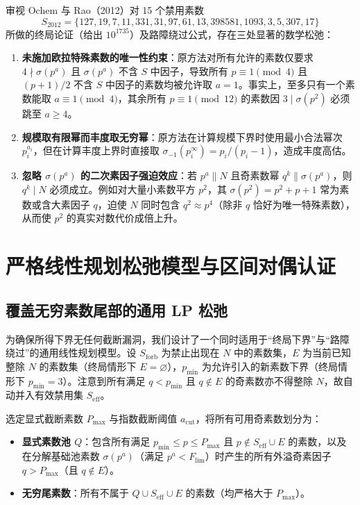 \documentclass[11pt, a4paper]{article}
\begin{document}
审视 Ochem 与 Rao（2012）对 15 个禁用素数
\[
S_{2012} = \{127, 19, 7, 11, 331, 31, 97, 61, 13, 398581, 1093, 3, 5, 307, 17\}
\]
所做的终局论证（给出 $10^{1735}$）及路障绕过公式，存在三处显著的数学松弛：
\begin{enumerate}
    \item \textbf{未施加欧拉特殊素数的唯一性约束}：原方法对所有允许的素数仅要求 $4 \nmid \sigma(p^a)$ 且 $\sigma(p^a)$ 不含 $S$ 中因子，导致所有 $p \equiv 1 \pmod{4}$ 且 $(p+1)/2$ 不含 $S$ 中因子的素数均被允许取 $a=1$。事实上，至多只有一个素数能取 $a \equiv 1 \pmod{4}$，其余所有 $p \equiv 1 \pmod{12}$ 的素数因 $3 \mid \sigma(p^2)$ 必须跳至 $a \ge 4$。
    \item \textbf{规模取有限幂而丰度取无穷幂}：原方法在计算规模下界时使用最小合法幂次 $p_i^{a_i}$，但在计算丰度上界时直接取 $\sigma_{-1}(p_i^{\infty}) = p_i/(p_i-1)$，造成丰度高估。
    \item \textbf{忽略 $\sigma(p^a)$ 的二次素因子强迫效应}：若 $p^a \parallel N$ 且奇素数幂 $q^k \parallel \sigma(p^a)$，则 $q^k \mid N$ 必须成立。例如对大量小素数平方 $p^2$，其 $\sigma(p^2) = p^2+p+1$ 常为素数或含大素因子 $q$，迫使 $N$ 同时包含 $q^2 \approx p^4$（除非 $q$ 恰好为唯一特殊素数），从而使 $p^2$ 的真实对数代价成倍上升。
\end{enumerate}

\section{严格线性规划松弛模型与区间对偶认证}

\subsection{覆盖无穷素数尾部的通用 LP 松弛}

为确保所得下界无任何截断漏洞，我们设计了一个同时适用于“终局下界”与“路障绕过”的通用线性规划模型。设 $S_{\mathrm{forb}}$ 为禁止出现在 $N$ 中的素数集，$E$ 为当前已知整除 $N$ 的素数集（终局情形下 $E = \varnothing$），$p_{\min}$ 为允许引入的新素数下界（终局情形下 $p_{\min} = 3$）。注意到所有满足 $q < p_{\min}$ 且 $q \notin E$ 的奇素数亦不得整除 $N$，故自动并入有效禁用集 $S_{\mathrm{eff}}$。

选定显式截断素数 $P_{\max}$ 与指数截断阈值 $a_{\mathrm{cut}}$，将所有可用奇素数划分为：
\begin{itemize}
    \item \textbf{显式素数池 $Q$}：包含所有满足 $p_{\min} \le p \le P_{\max}$ 且 $p \notin S_{\mathrm{eff}} \cup E$ 的素数，以及在分解基础池素数 $\sigma(p^a)$（满足 $p^a < F_{\mathrm{lim}}$）时产生的所有外溢奇素因子 $q > P_{\max}$（且 $q \notin E$）。
    \item \textbf{无穷尾素数}：所有不属于 $Q \cup S_{\mathrm{eff}} \cup E$ 的素数（均严格大于 $P_{\max}$）。
\end{itemize}
\end{document}
